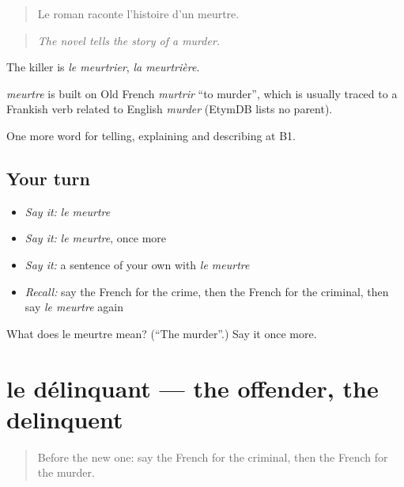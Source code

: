 \begin{quote}
Le roman raconte l'histoire d'un meurtre.
\end{quote}

\begin{quote}
\emph{The novel tells the story of a murder.}
\end{quote}

The killer is \emph{le meurtrier}, \emph{la meurtrière}.

\begin{cousinweb}
\emph{meurtre} is built on Old French \emph{murtrir} \textquotedblleft{}to murder\textquotedblright{}, which is usually traced to a Frankish verb related to English \emph{murder} (EtymDB lists no parent).
\end{cousinweb}

\begin{grammarlens}[title={What you've built}]
One more word for telling, explaining and describing at B1.
\end{grammarlens}

\subsection*{Your turn}
\begin{itemize}
\raggedright
  \item \emph{Say it:} \emph{le meurtre}
  \item \emph{Say it:} \emph{le meurtre}, once more
  \item \emph{Say it:} a sentence of your own with \emph{le meurtre}
  \item \emph{Recall:} say the French for the crime, then the French for the criminal, then say \emph{le meurtre} again
\end{itemize}

\begin{tcolorbox}[breakable,colback=teal!4,colframe=teal!35!black,title={Before you move on}]
What does le meurtre mean? (\textquotedblleft{}The murder\textquotedblright{}.) Say it once more.
\end{tcolorbox}
\section[le délinquant]{le délinquant — the offender, the delinquent}

\label{lesson:FR-C290-delinquant}



\begin{quote}
Before the new one: say the French for the criminal, then the French for the murder.
\end{quote}

